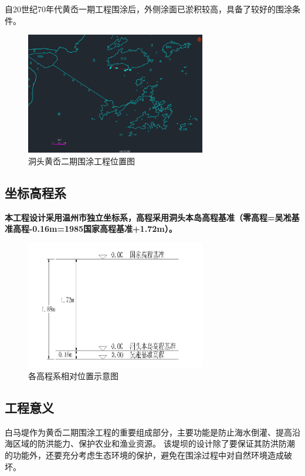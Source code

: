 \documentclass[UTF8, a4paper, 12pt]{ctexart} %
\begin{document}
自20世纪70年代黄岙一期工程围涂后，外侧涂面已淤积较高，具备了较好的围涂条件。
\begin{figure}[h]
    \centering
    \includegraphics[width=0.7\textwidth]{9.png}
    \caption{洞头黄岙二期围涂工程位置图}
    \label{fig:location}
    
\end{figure}

\subsection{坐标高程系}
\textbf{本工程设计采用温州市独立坐标系，高程采用洞头本岛高程基准（零高程=吴凇基准高程-0.16m=1985国家高程基准+1.72m）。}

\begin{figure}[h]
    \centering
    \includegraphics[width=0.7\textwidth]{1.png}
    \caption{各高程系相对位置示意图}
    \label{fig:location}
\end{figure}

\newpage
\subsection{工程意义}
白马堤作为黄岙二期围涂工程的重要组成部分，主要功能是防止海水倒灌、提高沿海区域的防洪能力、保护农业和渔业资源。
该堤坝的设计除了要保证其防洪防潮的功能外，还要充分考虑生态环境的保护，避免在围涂过程中对自然环境造成破坏。
\end{document}
